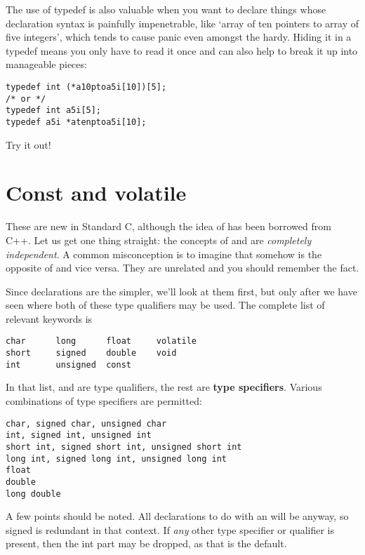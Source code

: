   The use of typedef is also valuable when you want to declare things
   whose declaration syntax is painfully impenetrable, like `array of ten
   pointers to array of five integers', which tends to cause panic even
   amongst the hardy. Hiding it in a typedef means you only have to read it
   once and can also help to break it up into manageable pieces:


\begin{Verbatim}
typedef int (*a10ptoa5i[10])[5];
/* or */
typedef int a5i[5];
typedef a5i *atenptoa5i[10];
\end{Verbatim}

  Try it out!


 
        \section{Const and volatile}
        

  

  These are new in Standard C, although the idea of \const{}
   has been borrowed from C++. Let us get one thing straight: the concepts
   of \const{} and \volatile{} are \textit{completely
   independent}. A common misconception is to imagine that somehow
   \const{} is the opposite of \volatile{} and vice
   versa. They are unrelated and you should remember the fact.


  Since \const{} declarations are the simpler, we'll look at
   them first, but only after we have seen where both of these type
   qualifiers may be used. The complete list of relevant keywords is


\begin{Verbatim}
char      long      float     volatile
short     signed    double    void
int       unsigned  const
\end{Verbatim}

  In that list, \const{} and \volatile{} are type
   qualifiers, the rest are \textbf{type specifiers}. Various combinations
   of type specifiers are permitted:


\begin{Verbatim}
char, signed char, unsigned char
int, signed int, unsigned int
short int, signed short int, unsigned short int
long int, signed long int, unsigned long int
float
double
long double
\end{Verbatim}

  A few points should be noted. All declarations to do with an
   \kint{} will be \signed{} anyway, so signed is
   redundant in that context. If \textit{any} other type specifier or
   qualifier is present, then the int part may be dropped, as that is the
   default.


